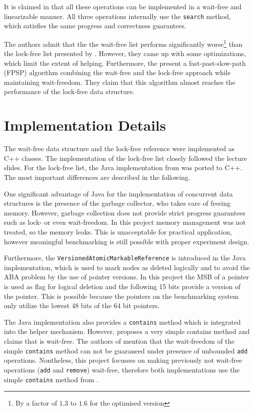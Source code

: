 \documentclass[a4paper, 12pt]{article}
\begin{document}
It is claimed in \cite{timnat12} that all these operations can be implemented in a wait-free and linearizable manner. All three operations internally use the \verb|search| method, which satisfies the same progress and correctness guarantees.

The authors admit that the the wait-free list performs significantly worse\footnote{By a factor of $1.3$ to $1.6$ for the optimised version} than the lock-free list presented by \cite{harris01}. However, they came up with some optimizations, which limit the extent of helping. Furthermore, the present a fast-past-slow-path (FPSP) algorithm combining the wait-free and the lock-free approach while maintaining wait-freedom. They claim that this algorithm almost reaches the performance of the lock-free data structure.

\newpage
\section{Implementation Details}

The wait-free data structure and the lock-free reference were implemented as C++ classes. The implementation of the lock-free list closely followed the lecture slides. For the lock-free list, the Java implementation from \cite{timnat12} was ported to C++. The most important differences are described in the following.

One significant advantage of Java for the implementation of concurrent data structures is the presence of the garbage collector, who takes care of freeing memory. However, garbage collection does not provide strict progress guarantees such as lock- or even wait-freedom. In this project memory management was not treated, so the memory leaks. This is unacceptable for practical application, however meaningful benchmarking is still possible with proper experiment design.

Furthermore, the \verb|VersionedAtomicMarkableReference| is introduced in the Java implementation, which is used to mark nodes as deleted logically and to avoid the ABA problem by the use of pointer versions. In this project the MSB of a pointer is used as flag for logical deletion and the following 15 bits provide a version of the pointer. This is possible because the pointers on the benchmarking system only utilize the lowest 48 bits of the 64 bit pointers.

The Java implementation also provides a \verb|contains| method which is integrated into the helper mechanism. However, \cite{herlihy12} proposes a very simple contains method and claims that is wait-free. The authors of \cite{timnat12} mention that the wait-freedom of the simple \verb|contains| method can not be guaraneed under presence of unbounded \verb|add| operations. Nontheless, this project focusses on making previously not wait-free operations (\verb|add| and \verb|remove|) wait-free, therefore both implementations use the simple \verb|contains| method from \cite{herlihy12}.
\end{document}
